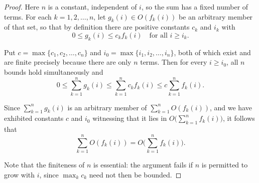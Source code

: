 \begin{proof}
  Here $n$ is a constant, independent of $i$, so the sum has a fixed number of
  terms. For each $k = 1, 2, \ldots, n$, let $g_k(i) \in O(f_k(i))$ be an
  arbitrary member of that set, so that by definition there are positive
  constants $c_k$ and $i_k$ with
  \[
    0 \leq g_k(i) \leq c_k f_k(i) \quad \text{for all } i \geq i_k.
  \]

  Put $c = \max\lbrace c_1, c_2, \ldots, c_n \rbrace$ and
  $i_0 = \max\lbrace i_1, i_2, \ldots, i_n \rbrace$, both of which exist and are
  finite precisely because there are only $n$ terms. Then for every
  $i \geq i_0$, all $n$ bounds hold simultaneously and
  \[
    0 \leq \sum_{k = 1}^n g_k(i) \leq \sum_{k = 1}^n c_k f_k(i)
    \leq c \sum_{k = 1}^n f_k(i).
  \]

  Since $\sum_{k=1}^n g_k(i)$ is an arbitrary member of $\sum_{k=1}^n
  O(f_k(i))$, and we have exhibited constants $c$ and $i_0$ witnessing that it
  lies in $O\bigl(\sum_{k=1}^n f_k(i)\bigr)$, it follows that
  \[
    \sum_{k = 1}^n O(f_k(i)) = O\biggl(\sum_{k = 1}^n f_k(i)\biggr).
  \]

  Note that the finiteness of $n$ is essential: the argument fails if $n$ is
  permitted to grow with $i$, since $\max_k c_k$ need not then be bounded.
\end{proof}
